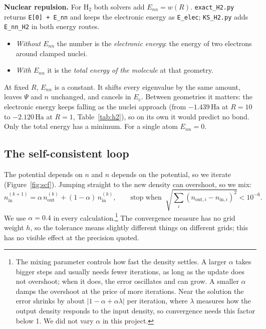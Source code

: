 \documentclass[11pt,a4paper]{article}
\newcommand{\Ha}{\ensuremath{\,\mathrm{Ha}}}
\begin{document}
\textbf{Nuclear repulsion.} For H$_2$ both solvers add $E_{nn}=w(R)$. \texttt{exact\_H2.py} returns \texttt{E[0] + E\_nn} and keeps
the electronic energy as \texttt{E\_elec}; \texttt{KS\_H2.py} adds \texttt{E\_nn\_H2} in both energy routes.
\begin{itemize}
  \item \emph{Without $E_{nn}$} the number is the \emph{electronic energy}: the energy of two electrons around clamped nuclei.
  \item \emph{With $E_{nn}$} it is the \emph{total energy of the molecule} at that geometry.
\end{itemize}
At fixed $R$, $E_{nn}$ is a constant. It shifts every eigenvalue by the same amount, leaves $\Psi$ and $n$ unchanged,
and cancels in $E_c$. Between geometries it matters: the electronic energy keeps falling as the nuclei approach
(from $-1.439$\Ha{} at $R=10$ to $-2.120$\Ha{} at $R=1$, Table~\ref{tab:h2}), so on its own it would predict no bond. Only
the total energy has a minimum. For a single atom $E_{nn}=0$.

\subsection{The self-consistent loop}

The potential depends on $n$ and $n$ depends on the potential, so we iterate (Figure~\ref{fig:scf}). Jumping straight to
the new density can overshoot, so we mix:
\begin{equation}
  n_\text{in}^{(k+1)}=\alpha\,n_\text{out}^{(k)}+(1-\alpha)\,n_\text{in}^{(k)},\qquad
  \text{stop when }\ \sqrt{\textstyle\sum_i(n_{\text{out},i}-n_{\text{in},i})^2}<10^{-6}.
\end{equation}
We use $\alpha=0.4$ in every calculation.\footnote{The mixing parameter controls how fast the density settles. A
larger $\alpha$ takes bigger steps and usually needs fewer iterations, as long as the update does not overshoot;
when it does, the error oscillates and can grow. A smaller $\alpha$ damps the overshoot at the price of more
iterations. Near the solution the error shrinks by about $|1-\alpha+\alpha\lambda|$ per iteration, where $\lambda$ measures how the
output density responds to the input density, so convergence needs this factor below 1. We did not vary $\alpha$
in this project.} The convergence measure has no grid weight $h$, so the tolerance means slightly different
things on different grids; this has no visible effect at the precision quoted.
\end{document}
